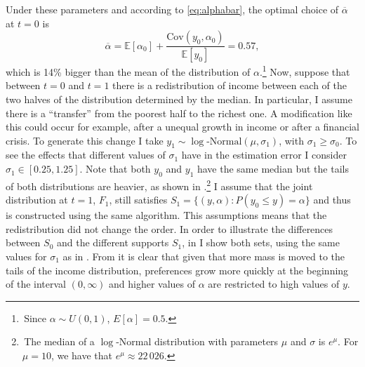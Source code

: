 \documentclass[english, a4paper, 12pt]{article}
\begin{document}
Under these parameters and according to \eqref{eq:alphabar}, the optimal choice of $\overline{\alpha}$ at $t = 0$ is
	\begin{equation} \label{eq:exAlphaBar}
		\overline{\alpha} 
			= \mathbb{E}[\alpha_{0}] + \frac{\mathrm{Cov}(y_{0}, \alpha_{0})}{\mathbb{E}[y_{0}]}
			= 0.57,
	\end{equation}
which is 14\% bigger than the mean of the distribution of $\alpha$.\footnote{\,Since $\alpha \sim U(0,1)$, $E[\alpha] = 0.5$.} Now, suppose that between $t = 0$ and $t = 1$ there is a redistribution of income between each of the two halves of the distribution determined by the median. In particular, I assume there is a ``transfer'' from the poorest half to the richest one. A modification like this could occur for example, after a unequal growth in income or after a financial crisis. To generate this change I take $y_{1} \sim \log\text{-Normal}(\mu, \sigma_{1})$, with $\sigma_{1} \geq \sigma_{0}$. To see the effects that different values of $\sigma_{1}$ have in the estimation error I consider $\sigma_{1} \in [0.25, 1.25]$. Note that both $y_{0}$ and $y_{1}$ have the same median but the tails of both distributions are heavier, as shown in .\footnote{\,The median of a $\log$-Normal distribution with parameters $\mu$ and $\sigma$ is $e^{\mu}$. For $\mu = 10$, we have that $e^{\mu} \approx 22\,026$.} I assume that the joint distribution at $t = 1$, $F_{1}$, still satisfies $S_{1} = \{(y,\alpha) : P(y_{0} \leq y) = \alpha\}$ and thus is constructed using the same algorithm. This assumptions means that the redistribution did not change the order. In order to illustrate the differences between $S_{0}$ and the different supports $S_{1}$, in  I show both sets, using the same values for $\sigma_{1}$ as in . From  it is clear that given that more mass is moved to the tails of the income distribution, preferences grow more quickly at the beginning of the interval $(0, \infty)$ and higher values of $\alpha$ are restricted to high values of $y$.
\end{document}
